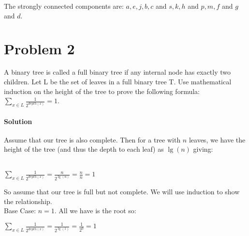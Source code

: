 \documentclass[12pt]{article}
\begin{document}
The strongly connected components are: $a,e,j,b,c$ and $s,k,h$ and $p,m,f$ and $g$ and $d$.



\section{Problem 2}
A binary tree is called a full binary tree if any internal node has exactly two children. Let L be the set of leaves in a full binary tree T. Use mathematical induction on the height of the tree to prove the following formula:
$ \sum\limits_{x \in L} \frac{1}{2^{depth(x)}} = 1 $.

\paragraph{Solution}
Assume that our tree is also complete.  Then for a tree with $n$ leaves, we have the height of the tree (and thus the depth to each leaf) as $\lg(n)$ giving: \\
\\
\centerline{$ \sum\limits_{x \in L} \frac{1}{2^{depth(x)}} = \frac{n}{2^{\lg(n)}} = \frac{n}{n} = 1 $}

So assume that our tree is full but not complete.  We will use induction to show the relationship.\\
Base Case: $n = 1$.  All we have is the root so: \\
\centerline{$ \sum\limits_{x \in L} \frac{1}{2^{depth(x)}} = \frac{1}{2^{\lg(1)}} = \frac{1}{2^0} = 1 $}
\end{document}
